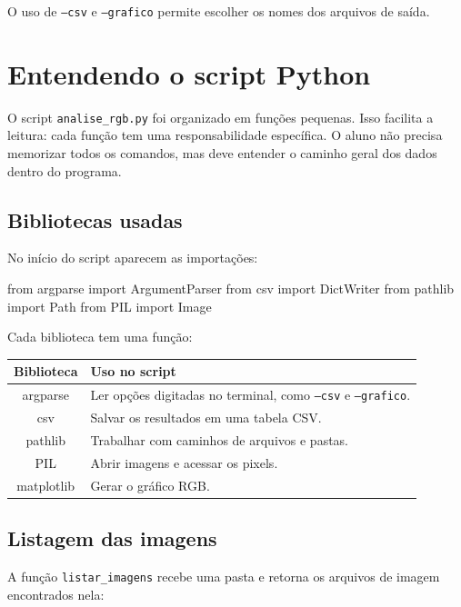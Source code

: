 \documentclass[12pt]{article}
\begin{document}
O uso de \texttt{--csv} e \texttt{--grafico} permite escolher os nomes dos arquivos de saída.

\section{Entendendo o script Python}

O script \texttt{analise\_rgb.py} foi organizado em funções pequenas. Isso facilita a leitura: cada função tem uma responsabilidade específica. O aluno não precisa memorizar todos os comandos, mas deve entender o caminho geral dos dados dentro do programa.

\subsection{Bibliotecas usadas}

No início do script aparecem as importações:

\begin{codebox}
from argparse import ArgumentParser
from csv import DictWriter
from pathlib import Path
from PIL import Image
\end{codebox}

Cada biblioteca tem uma função:

\begin{cmdbox}
\begin{tabularx}{\linewidth}{@{}C >{\raggedright\arraybackslash}X@{}}
\toprule
\textbf{Biblioteca} & \textbf{Uso no script} \\
\midrule
argparse & Ler opções digitadas no terminal, como \texttt{--csv} e \texttt{--grafico}. \\
csv & Salvar os resultados em uma tabela CSV. \\
pathlib & Trabalhar com caminhos de arquivos e pastas. \\
PIL & Abrir imagens e acessar os pixels. \\
matplotlib & Gerar o gráfico RGB. \\
\bottomrule
\end{tabularx}
\end{cmdbox}

\subsection{Listagem das imagens}

A função \texttt{listar\_imagens} recebe uma pasta e retorna os arquivos de imagem encontrados nela:
\end{document}
